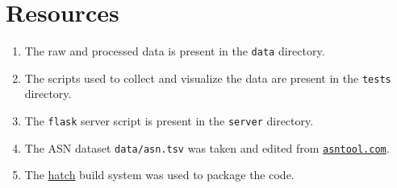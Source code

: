 \documentclass[journal,12pt,twocolumn]{IEEEtran}
\begin{document}
\section{Resources}

\begin{enumerate}
     \item The raw and processed data is present in the \texttt{data} directory.
     \item The scripts used to collect and visualize the data are present in the
     \texttt{tests} directory.
     \item The \texttt{flask} server script is present in the \texttt{server}
     directory.
     \item The ASN dataset \texttt{data/asn.tsv} was taken and edited from
     \href{https://asntool.com/}{\texttt{asntool.com}}.
     \item The \href{https://hatch.pypa.io/latest/}{hatch} build system was used
     to package the code.
\end{enumerate}
\end{document}
